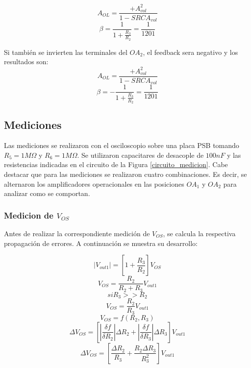 \begin{displaymath}  A_{OL}= \frac{+A_{vol}^2}{1-SRC A_{vol}}  \end{displaymath}
\begin{displaymath}  \beta =  \frac{1}{1+ \frac{R_3}{R_2}} = \frac{1}{1201}  \end{displaymath}

Si también se invierten las terminales del $OA_2$, el feedback sera negativo y los resultados son:
\begin{displaymath}  A_{OL}= \frac{+A_{vol}^2}{1-SRC A_{vol}}  \end{displaymath}
\begin{displaymath}  \beta =  -\frac{1}{1+ \frac{R_3}{R_2}} = \frac{1}{1201}  \end{displaymath}

\subsection{Mediciones}
Las mediciones se realizaron con el osciloscopio sobre una placa PSB tomando $R_5 = 1M\Omega$ y $R_6 = 1M\Omega$. Se utilizaron capacitares de desacople de $100nF$ y las resistencias indicadas en el circuito de la Figura \ref{circuito_medicion}.
Cabe destacar que para las mediciones se realizaron cuatro combinaciones. Es decir, se alternaron los amplificadores operacionales en las posiciones $OA_1$ y $OA_2$ para analizar como se comportan. 


\subsubsection{Medicion de $V_{OS}$}

Antes de realizar la correspondiente medición de $V_{OS}$, se calcula la respectiva propagación de errores.  A continuación se muestra su desarrollo:

\begin{displaymath} |V_{out1}| = [1 + \frac{R_3}{R_2}]V_{OS} \end{displaymath}
\begin{displaymath} V_{OS} = \frac{R_2}{R_2 + R_3} V_{out1} \end{displaymath}
\begin{displaymath} si R_3 >> R_2 \end{displaymath}  
\begin{displaymath} V_{OS} = \frac{R_2}{R_3} V_{out1} \end{displaymath} 
\begin{displaymath} V_{OS} = f(R_2,R_3) \end{displaymath} 
\begin{displaymath} \Delta V_{OS} = [|\frac{\delta f}{\delta R_2}| \Delta R_2 + |\frac{\delta f}{\delta R_3}| \Delta R_3 ] V_{out1} \end{displaymath} 
\begin{displaymath} \Delta V_{OS} = [\frac {\Delta R_2} { R_3} + \frac{R_2 \Delta R_3 }{R_3^2}] V_{out1} \end{displaymath} 

